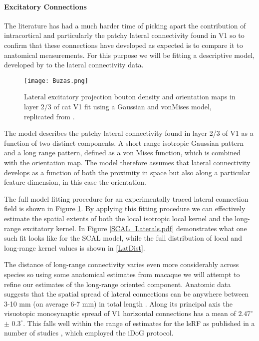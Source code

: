 \paragraph{Excitatory Connections}

The literature has had a much harder time of picking apart the
contribution of intracortical and particularly the patchy lateral
connectivity found in V1 so to confirm that these connections have
developed as expected is to compare it to anatomical measurements.
For this purpose we will be fitting a descriptive model, developed by
\cite{Buzas2006} to the lateral connectivity data.

\begin{figure}
	\centering
        \texttt{[image: Buzas.png]}
	\caption{Lateral excitatory projection bouton density and
          orientation maps in layer 2/3 of cat V1 fit using a Gaussian
          and vonMises model, replicated from \cite{Buzas2006}.}
	\label{Buzas}
\end{figure}

The model describes the patchy lateral connectivity found in layer 2/3
of V1 as a function of two distinct components. A short range
isotropic Gaussian pattern and a long range pattern, defined as a von
Mises function, which is combined with the orientation map. The model
therefore assumes that lateral connectivity develops as a function of
both the proximity in space but also along a particular feature
dimension, in this case the orientation.

The full model fitting procedure for an experimentally traced lateral
connection field is shown in Figure \ref{Buzas}. By applying this
fitting procedure we can effectively estimate the spatial extents of
both the local isotropic local kernel and the long-range excitatory
kernel. In Figure \ref{SCAL_Laterals.pdf} demonstrates what one such
fit looks like for the SCAL model, while the full distribution of
local and long-range kernel values is shown in \ref{LatDist}.

The distance of long-range connectivity varies even more considerably
across species so using some anatomical estimates from macaque we will
attempt to refine our estimates of the long-range oriented
component. Anatomic data suggests that the spatial spread of lateral
connections can be anywhere between 3-10 mm (on average 6-7 mm) in
total length \cite{Angelucci2002}. Along its principal axis the
visuotopic monosynaptic spread of V1 horizontal connections has a mean
of \(2.47^\circ\) \(\pm\) \(0.3^\circ\). This falls well within the
range of estimates for the lsRF as published in a number of studies
\cite{Sceniak1999, Sceniak2001, Shushruth2009}, which employed the
iDoG protocol.

